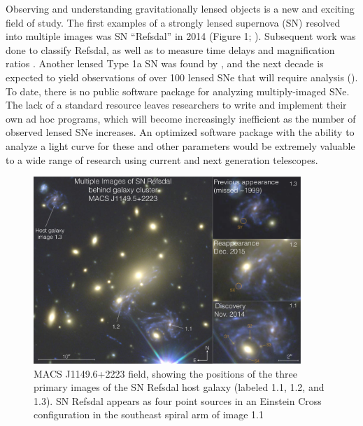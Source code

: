 \thispagestyle{fancy}
\lhead{}
\rhead{}
\renewcommand{\headrulewidth}{1pt}
\renewcommand{\footrulewidth}{0pt}
\newcommand{\packageName}{\textit{SNTD}}
\fancyfoot[C]{}

\pagestyle{fancy}

Observing and understanding gravitationally lensed objects is a new
and exciting field of study. The first examples of a strongly lensed
supernova (SN) resolved into multiple images was SN ``Refsdal'' in
2014 (Figure 1; \citet{Kelly:2015a}). Subsequent work was done to
classify Refsdal, as well as to measure time delays and magnification
ratios \citep{Kelly:2016,Rodney:2016}. Another lensed Type 1a SN was found
by \cite{Goobar:2016}, and the next decade is expected to yield observations
of over 100 lensed SNe that will require analysis (\cite{Oguri:2010}).
To date, there is no public software package for analyzing multiply-imaged SNe. 
The lack of a standard resource leaves researchers to write and implement their 
own ad hoc programs, which will become increasingly inefficient as the number of
observed lensed SNe increases. 
An optimized software package with the ability to analyze a light curve for 
these and other parameters would be extremely valuable to a wide range of
 research using current and next generation telescopes.

\begin{figure}[h]
\centering
\includegraphics[width=0.9\textwidth]{refsdal_rodney.pdf}
\caption{
MACS J1149.6+2223 field, showing the positions of the three primary
images of the SN Refsdal host galaxy (labeled 1.1, 1.2, and 1.3). SN
Refsdal appears as four point sources in an Einstein Cross
configuration in the southeast spiral arm of image 1.1 \cite{Rodney:2016}}
\end{figure}



